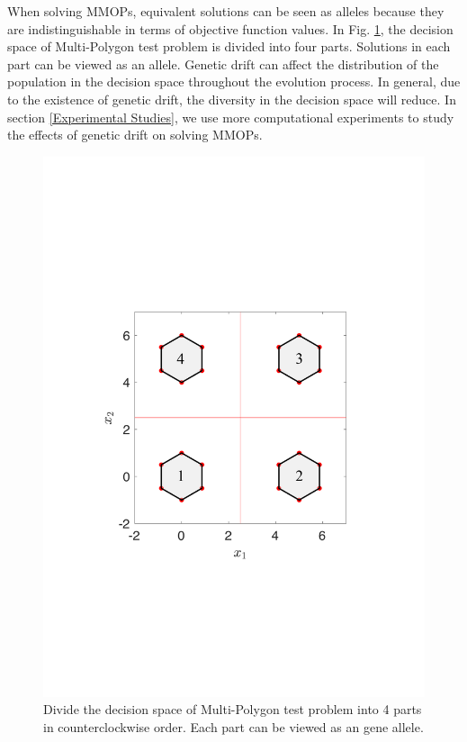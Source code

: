 \documentclass[conference]{IEEEtran}
\begin{document}
When solving MMOPs, equivalent solutions can be seen as alleles because they are indistinguishable in terms of objective function values. In Fig. \ref{fig: Alleles}, the decision space of Multi-Polygon test problem is divided into four parts. Solutions in each part can be viewed as an allele. Genetic drift can affect the distribution of the population in the decision space throughout the evolution process. In general, due to the existence of genetic drift, the diversity in the decision space will reduce. In section \ref{Experimental Studies}, we use more computational experiments to study the effects of genetic drift on solving MMOPs.

\begin{figure}[htbp]
    \centering
    \includegraphics[width=.24\textwidth]{Section3/Alleles}
    \caption{Divide the decision space of Multi-Polygon test problem into 4 parts in counterclockwise order. Each part can be viewed as an gene allele.}
    \label{fig: Alleles}
\end{figure}
\end{document}
